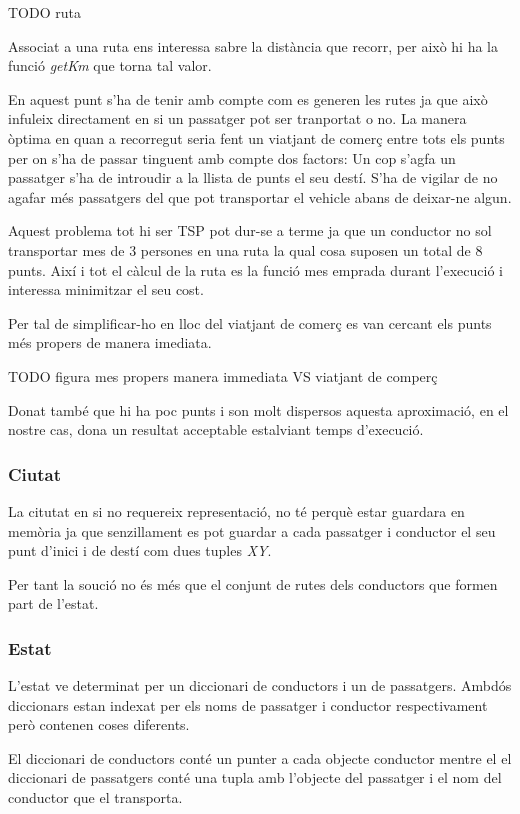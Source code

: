 TODO ruta


Associat a una ruta ens interessa sabre la distància que recorr, per això hi ha la funció \emph{getKm}
que torna tal valor.

En aquest punt s'ha de tenir amb compte com es generen les rutes ja que això infuleix directament en
si un passatger pot ser tranportat o no. La manera òptima en quan a recorregut seria fent un viatjant
de comerç entre tots els punts per on s'ha de passar tinguent amb compte dos factors:
Un cop s'agfa un passatger s'ha de introudir a la llista de punts el seu destí.
S'ha de vigilar de no agafar més passatgers del que pot transportar el vehicle
abans de deixar-ne algun.

Aquest problema tot hi ser TSP pot dur-se a terme ja que un conductor no sol transportar mes de 3
persones en una ruta la qual cosa suposen un total de 8 punts. Així i tot el càlcul de la ruta
es la funció mes emprada durant l'execució i interessa minimitzar el seu cost.

Per tal de simplificar-ho en lloc del viatjant de comerç es van cercant els punts més propers de
manera imediata.

TODO figura mes propers manera immediata VS viatjant de comperç

Donat també que hi ha poc punts i son molt dispersos aquesta aproximació, en el nostre cas,
dona un resultat acceptable estalviant temps d'execució.


\subsubsection{Ciutat}
La citutat en si no requereix representació, no té perquè estar guardara en memòria ja que senzillament
es pot guardar a cada passatger i conductor el seu punt d'inici i de destí com dues tuples \emph{XY}.

Per tant la so\lgem ució no és més que el conjunt de rutes dels conductors que formen part de l'estat.

\subsubsection{Estat}
L'estat ve determinat per un diccionari de conductors i un de passatgers. Ambdós diccionars estan
indexat per els noms de passatger i conductor respectivament però contenen coses diferents.

El diccionari de conductors conté un punter a cada objecte conductor mentre el el diccionari
de passatgers conté una tupla amb l'objecte del passatger i el nom del conductor que el transporta.


